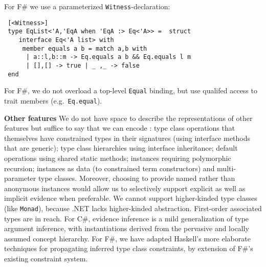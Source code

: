 \documentclass[9pt]{sig-alternate-05-2015}
\newif\ifclassic
\begin{document}
\ifclassic
For F\# we adopt the more concise, nameless declaration:

\lstset{language={FSharp}}
\begin{lstlisting}
instance Eq 'a => Eq (List 'a) where 
  Equal(a,b) = match a,b with
    | (a::l),(b::m) -> Equal(a,b) && Equal(l,m)
    | [],[] -> true | _,_ -> false
\end{lstlisting}
\else
For F\# we use a parameterized \lstinline{Witness}-declaration:
\begin{lstlisting}
 [<Witness>] 
 type EqList<'A,'EqA when 'EqA :> Eq<'A>> =  struct
    interface Eq<'A list> with
     member equals a b = match a,b with
      | a::l,b::m -> Eq.equals a b && Eq.equals l m
      | [],[] -> true | _ ,_ -> false
 end 
\end{lstlisting}
For F\#, we do not overload a top-level \lstinline{Equal} binding, but use qualifed access to trait members (e.g.\ \lstinline{Eq.equal}).

\fi
{\bf Other features}
We do not have space to describe the representations of other features but suffice to say that we can encode \cite{natural}:
type class operations that themselves have constrained types in their signatures (using interface methods that are generic);
type class hierarchies  using interface inheritance; default operations using shared static methods; instances requiring 
polymorphic recursion; instances as data (to constrained term constructors) and multi-parameter type classes. Moreover, choosing to provide named rather than anonymous instances would allow us to selectively support
explicit as well as implicit evidence when preferable. 
We cannot support  higher-kinded type classes (like \lstinline{Monad}), because .NET lacks higher-kinded abstraction.
First-order associated types are in reach.
For C\#, evidence inference is a mild generalization of type argument inference, with instantiations derived from the pervasive and locally assumed concept hierarchy.
For F\#, we have adapted Haskell's more elaborate techniques for propagating inferred type class constraints, by extension of F\#'s existing constraint system.
\end{document}
